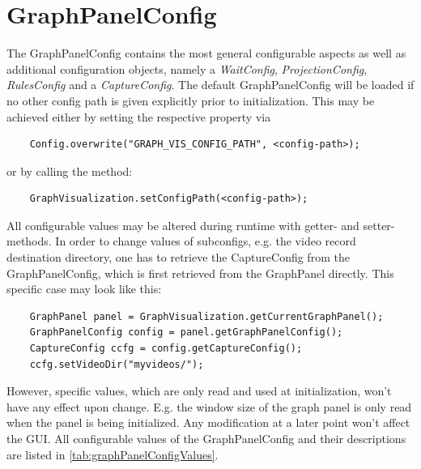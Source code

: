 \section{GraphPanelConfig}
The GraphPanelConfig contains the most general configurable aspects as well as additional configuration objects, namely a \emph{WaitConfig}, \emph{ProjectionConfig}, \emph{RulesConfig} and a \emph{CaptureConfig}. The default GraphPanelConfig will be loaded if no other config path is given explicitly prior to initialization. This may be achieved either by setting the respective property via 
\begin{lstlisting}
	Config.overwrite("GRAPH_VIS_CONFIG_PATH", <config-path>);
\end{lstlisting}
or by calling the method:
\begin{lstlisting}
	GraphVisualization.setConfigPath(<config-path>);
\end{lstlisting}
All configurable values may be altered during runtime with getter- and setter-methods. In order to change values of subconfigs, e.g. the video record destination directory, one has to retrieve the CaptureConfig from the GraphPanelConfig, which is first retrieved from the GraphPanel directly. This specific case may look like this:
\begin{lstlisting}
	GraphPanel panel = GraphVisualization.getCurrentGraphPanel();
	GraphPanelConfig config = panel.getGraphPanelConfig();
	CaptureConfig ccfg = config.getCaptureConfig();
	ccfg.setVideoDir("myvideos/");
\end{lstlisting}
However, specific values, which are only read and used at initialization, won't have any effect upon change. E.g. the window size of the graph panel is only read when the panel is being initialized. Any modification at a later point won't affect the GUI. 
All configurable values of the GraphPanelConfig and their descriptions are listed in \ref{tab:graphPanelConfigValues}.

